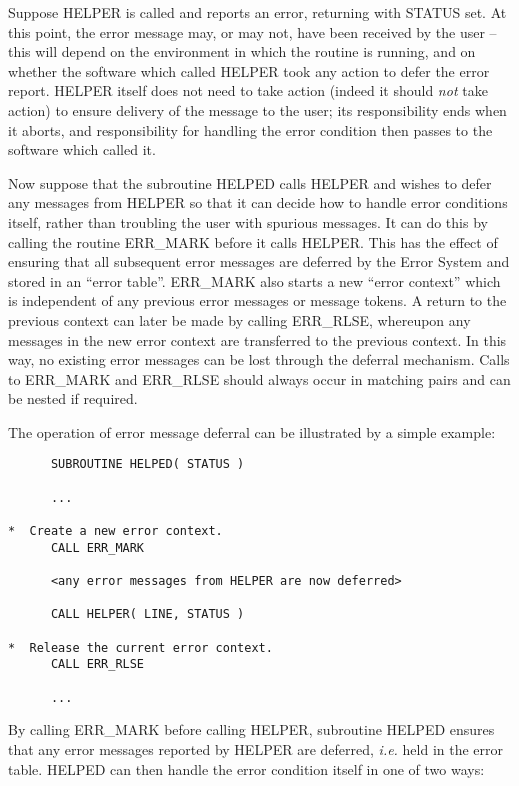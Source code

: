 Suppose HELPER is called and reports an error, returning with STATUS set.
At this point, the error message may, or may not, have been received by the
user -- this will depend on the environment in which the routine is running,
and on whether the software which called HELPER took any action to defer the
error report. 
HELPER itself does not need to take action (indeed it should {\em not} take 
action) to ensure delivery of the message to the user; its responsibility 
ends when it aborts, and responsibility for handling the error condition then
passes to the software which called it. 

Now suppose that the subroutine HELPED calls HELPER and wishes to defer any
messages from HELPER so that it can decide how to handle error conditions
itself, rather than troubling the user with spurious messages. 
It can do this by calling the routine ERR\_MARK before it calls HELPER.
This has the effect of ensuring that all subsequent error messages are
deferred by the Error System and stored in an ``error table''.
ERR\_MARK also starts a new ``error context'' which is independent of any 
previous error messages or message tokens.
A return to the previous context can later be made by calling ERR\_RLSE, 
whereupon any messages in the new error context are transferred to the 
previous context.
In this way, no existing error messages can be lost through the deferral 
mechanism.
Calls to ERR\_MARK and ERR\_RLSE should always occur in matching pairs and can
be nested if required.

The operation of error message deferral can be illustrated by a simple
example:

\begin {small}
\begin{verbatim}
      SUBROUTINE HELPED( STATUS )

      ...

*  Create a new error context.
      CALL ERR_MARK

      <any error messages from HELPER are now deferred>

      CALL HELPER( LINE, STATUS )

*  Release the current error context.
      CALL ERR_RLSE

      ...
\end{verbatim}
\end {small}

By calling ERR\_MARK before calling HELPER, subroutine HELPED ensures that any
error  messages reported by HELPER are deferred, {\em i.e.} held in the error table.
HELPED can then handle the error condition itself in one of two ways:

